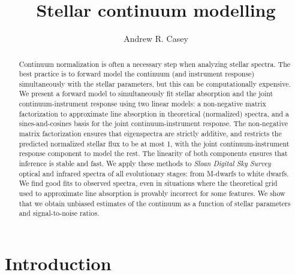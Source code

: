 \documentclass[modern]{aastex631}
\newcommand{\project}[1]{\textit{#1}}
\begin{document}
\title{\Huge Stellar continuum modelling}

\author[0000-0003-0174-0564]{Andrew R. Casey}



\begin{abstract}\noindent
Continuum normalization is often a necessary step when analyzing stellar spectra. The best practice is to forward model the continuum (and instrument response) simultaneously with the stellar parameters, but this can be computationally expensive.
We present a forward model to simultaneously fit stellar absorption and the joint continuum-instrument response using two linear models: a non-negative matrix factorization to approximate line absorption in theoretical (normalized) spectra, and a sines-and-cosines basis for the joint continuum-instrument response.
The non-negative matrix factorization ensures that eigenspectra are strictly additive, and restricts the predicted normalized stellar flux to be at most 1, with the joint continuum-instrument response component to model the rest.
The linearity of both components ensures that inference is stable and fast.
We apply these methods to \project{Sloan Digital Sky Survey} optical and infrared spectra of all evolutionary stages: from M-dwarfs to white dwarfs.
We find good fits to observed spectra, even in situations where the theoretical grid used to approximate line absorption is provably incorrect for some features.
We show that we obtain unbiased estimates of the continuum as a function of stellar parameters and signal-to-noise ratios.
\end{abstract}


\section*{}\clearpage
\section{Introduction}\label{sec:intro}
\end{document}
